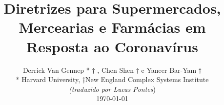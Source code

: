 \documentclass[onecolumn,journal]{IEEEtran}
\begin{document}
\title{\color{Brown}  Diretrizes para Supermercados, Mercearias e Farmácias em Resposta ao Coronavírus
\vspace{-0.35ex}}
\author{Derrick Van Gennep * † , Chen Shen † e Yaneer Bar-Yam † \\ * Harvard University, †New England Complex Systems Institute \\
\vspace{+0.35ex}
\small{\textit{(traduzido por Lucas Pontes})}\\
 \today
  \vspace{-8ex} \\
\textbf{}
 }

\maketitle




\thispagestyle{empty} %




\end{document}
